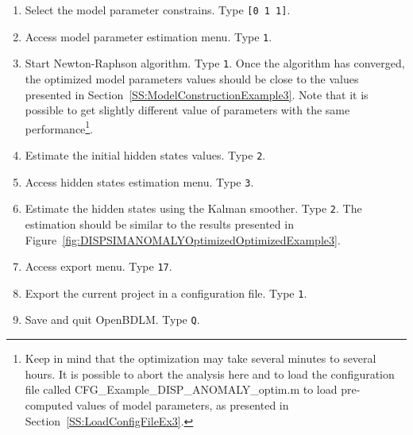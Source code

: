 \begin{enumerate}
\item Select the model parameter constrains. Type \colorbox{light-gray}{\lstinline[basicstyle = \mlttfamily \small, backgroundcolor = \color{light-gray}]![0 1 1]!}.
\item Access model parameter estimation menu. Type \colorbox{light-gray}{\lstinline[basicstyle = \mlttfamily \small, backgroundcolor = \color{light-gray}]!1!}. 
\item Start Newton-Raphson algorithm. Type \colorbox{light-gray}{\lstinline[basicstyle = \mlttfamily \small, backgroundcolor = \color{light-gray}]!1!}. Once the algorithm has converged, the optimized model parameters values should be close to the values presented in Section~\ref{SS:ModelConstructionExample3}. Note that it is possible to get slightly different value of parameters with the same performance\footnote{Keep in mind that the optimization may take several minutes to several hours. It is possible to abort the analysis here and to load the configuration file called CFG\_Example\_DISP\_ANOMALY\_optim.m to load pre-computed values of model parameters, as presented in Section~\ref{SS:LoadConfigFileEx3}.}.
\item Estimate the initial hidden states values. Type \colorbox{light-gray}{\lstinline[basicstyle = \mlttfamily \small, backgroundcolor = \color{light-gray}]!2!}.
\item Access hidden states estimation menu. Type \colorbox{light-gray}{\lstinline[basicstyle = \mlttfamily \small, backgroundcolor = \color{light-gray}]!3!}. 
\item Estimate the hidden states using the Kalman smoother. Type \colorbox{light-gray}{\lstinline[basicstyle = \mlttfamily \small, backgroundcolor = \color{light-gray}]!2!}. The estimation should be similar to the results presented in Figure~\ref{fig:DISPSIMANOMALYOptimizedOptimizedExample3}.
\item Access export menu. Type \colorbox{light-gray}{\lstinline[basicstyle = \mlttfamily \small, backgroundcolor = \color{light-gray}]!17!}. 
\item Export the current project in a configuration file. Type \colorbox{light-gray}{\lstinline[basicstyle = \mlttfamily \small, backgroundcolor = \color{light-gray}]!1!}.
\item Save and quit OpenBDLM. Type \colorbox{light-gray}{\lstinline[basicstyle = \mlttfamily \small, backgroundcolor = \color{light-gray}]!Q!}.
\end{enumerate}


